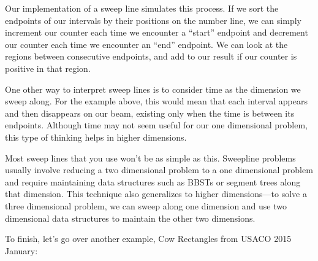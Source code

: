 Our implementation of a sweep line simulates this process. If we sort the endpoints of our intervals by their positions on the number line, we can simply increment our counter each time we encounter a ``start'' endpoint and decrement our counter each time we encounter an ``end'' endpoint. We can look at the regions between consecutive endpoints, and add to our result if our counter is positive in that region.

\begin{center}\end{center}

One other way to interpret sweep lines is to consider time as the dimension we sweep along. For the example above, this would mean that each interval appears and then disappears on our beam, existing only when the time is between its endpoints. Although time may not seem useful for our one dimensional problem, this type of thinking helps in higher dimensions. 

Most sweep lines that you use won't be as simple as this. Sweepline problems usually involve reducing a two dimensional problem to a one dimensional problem and require maintaining data structures such as BBSTs or segment trees along that dimension. This technique also generalizes to higher dimensions---to solve a three dimensional problem, we can sweep along one dimension and use two dimensional data structures to maintain the other two dimensions.

To finish, let's go over another example, Cow Rectangles from USACO 2015 January:

